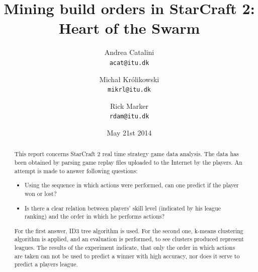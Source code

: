 \documentclass[a4paper,11pt]{article}
\begin{document}
\graphicspath{ {./images/} }
\date{May 21st 2014}
\title{Mining build orders in StarCraft 2: Heart of the Swarm}

\author{Andrea Catalini\\
\texttt{acat@itu.dk}
\and Michał Królikowski\\
\texttt{mikrl@itu.dk}
\and Rick Marker\\
\texttt{rdam@itu.dk}}

\clearpage\maketitle
\thispagestyle{empty}
\setcounter{page}{1}
\begin{abstract}
This report concerns StarCraft 2 real time strategy game data analysis.
The data has been obtained by parsing game replay files uploaded to the Internet by the players. An attempt is made to answer following questions:
\begin{itemize}
\item Using the sequence in which actions were performed, can one predict if the player won or lost?
\item Is there a clear relation between players’ skill level (indicated by his league ranking) and the order in which he performs actions?
\end{itemize}
For the first answer, ID3 tree algorithm is used. For the second one, k-means clustering algorithm is applied, and  an evaluation is performed, to see clusters produced represent leagues.
The results of the experiment  indicate, that only the order in which actions are taken can not be used to predict a winner with high accuracy, nor does it serve to predict a players league.
\end{abstract}

\end{document}
